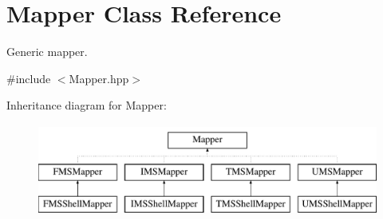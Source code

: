 \hypertarget{classMapper}{
\section{Mapper Class Reference}
\label{classMapper}
}


Generic mapper.  




{\ttfamily \#include $<$Mapper.hpp$>$}

Inheritance diagram for Mapper:\begin{figure}[H]
\begin{center}
\leavevmode
\includegraphics[height=3.000000cm]{classMapper}
\end{center}
\end{figure}
